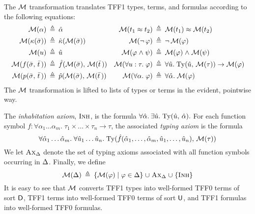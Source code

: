 The $\mathcal{M}$ transformation translates TFF1 types, terms, and formulas
according to the following equations:
\begin{align*}
\mathcal{M}(\alpha) &\:\triangleq\: \hat{\alpha} &
  \mathcal{M}(t_1 \approx t_2) &\:\triangleq\: \mathcal{M}(t_1) \approx \mathcal{M}(t_2) \\
\mathcal{M}(\kappa(\bar{\sigma})) &\:\triangleq\: \hat{\kappa}(\mathcal{M}(\bar{\sigma})) &
  \mathcal{M}(\lnot\, \varphi) &\:\triangleq\: \lnot\, \mathcal{M}(\varphi) \\
\mathcal{M}(u) &\:\triangleq\: \hat{u} &
  \mathcal{M}(\varphi \mathrel{\land} \psi) &\:\triangleq\: \mathcal{M}(\varphi) \mathrel{\land} \mathcal{M}(\psi) \\
\mathcal{M}(f(\bar{\sigma},\,\bar{t}\,)) &\:\triangleq\: \hat{f}(\mathcal{M}(\bar{\sigma}),\,\mathcal{M}(\bar{t}\,)) &
  \mathcal{M}(\forall u \mathrel{:} \tau .\; \varphi) &\:\triangleq\:
  \forall \hat{u} .\; \mathrm{Ty}(\hat{u},\, \mathcal{M}(\tau)) \rightarrow \mathcal{M}(\varphi) \\
\mathcal{M}(p(\bar{\sigma},\,\bar{t}\,)) &\:\triangleq\: \hat{p}(\mathcal{M}(\bar{\sigma}),\,\mathcal{M}(\bar{t}\,)) &
  \mathcal{M}(\forall \alpha .\; \varphi) &\:\triangleq\:
  \forall \hat{\alpha} .\; \mathcal{M}(\varphi)
\end{align*}
%
\newcommand{\AxD}{\text{\sc Ax}_{\DEL}}%
\newcommand{\Inh}{\text{\sc Inh}}%
\newcommand{\Dom}{\mathrm{Dom}}%
%
The $\mathcal{M}$ transformation is lifted to lists of types or terms in the evident,
pointwise way.

The {\em inhabitation axiom}, $\Inh$, is the formula
$\forall \hat{\alpha}.\> \exists \hat{u} .\;
\mathrm{Ty}(\hat{u},\,\hat{\alpha}).$
For each function symbol $f :
\forall \alpha_1\dots\alpha_m .\; \tau_1 \times \dots \times \tau_n \to \tau$,
the associated {\em typing axiom\/} is the formula
$$
\forall \hat{\alpha}_1\dots\hat{\alpha}_m .\;
\forall \hat{u}_1\dots\hat{u}_n .\;
\typeof(\hat{f}(\hat{\alpha}_1,\dots,\hat{\alpha}_m,
\hat{u}_1,\dots,\hat{u}_n),\, \MON(\tau))%
$$
We let $\AxD$ denote the set of typing axioms associated with all function
symbols occurring in $\mathrm{\Delta}$.
%
Finally, we define
$$
\MON(\DEL) \eqdef \{ \MON(\varphi) \vb \varphi \in \DEL \} \mathrel\cup
\AxD \mathrel\cup \{ \Inh \}%
$$
%
It is easy to see that $\mathcal{M}$ converts TFF1 types into well-formed TFF0 terms of
sort $\mathsf{D}$, TFF1 terms into well-formed TFF0 terms of sort $\mathsf{U}$, and
TFF1 formulas into well-for\-med TFF0 formulas.

